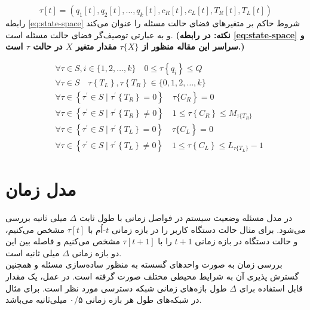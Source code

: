 \begin{equation}
	\label{eg:state}
	\tau[t]=\left(q_{1}[t], q_{2}[t], \ldots, q_{k}[t], c_{R}[t], c_{L}[t], T_{R}[t], T_{L}[t]\right)
\end{equation}
رابطه \ref{eq:state-space} شروط حاکم بر متغیرهای فضای حالت مسئله را عنوان می‌کند و به عبارتی توصیف‌گر فضای حالت مسئله است. \textbf{(نکته: در رابطه \ref{eq:state-space} و سراسر این مقاله منظور از \(\tau\{X\}\) مقدار متغیر \(X\) در حالت \(\tau\) است.)}

\begin{equation}
	\label{eq:state-space}
	\begin{aligned}
		&\forall \tau \in S, i \in \{1,2, \ldots, k\} \quad 0 \leqslant\tau\left\{q_{i}\right\} \leqslant Q\\
		&\forall \tau \in S \quad  \tau\left\{T_L\right\},  \tau\left\{T_R\right\} \in \{0, 1,2, \ldots, k\}\\
		&\left.\forall \tau \in\left\{\tau^{\prime} \in S \mid \tau^{\prime}\left\{T_{R}\right\}=0\right\} \quad \tau\{C_R\right\}=0\\
		&\forall \tau \in\left\{\tau^{\prime} \in S \mid \tau^{\prime}\left\{T_{R}\right\} \neq 0\right\} \quad 1 \leqslant \tau\left\{C_{R}\right\} \leqslant M_{\tau\{T_{R}\}} \\
		&\left.\forall \tau \in\left\{\tau^{\prime} \in S \mid \tau^{\prime}\left\{T_{L}\right\}=0\right\} \quad \tau\{C_L\right\}=0\\
		&\forall \tau \in\left\{\tau^{\prime} \in S \mid \tau^{\prime}\left\{T_{L}\right\} \neq 0\right\} \quad 1 \leqslant \tau\left\{C_{L}\right\} \leqslant L_{\tau\{T_{L}\}} - 1
	\end{aligned}
\end{equation}

\newpage
\section{مدل زمان}
در مدل مسئله وضعیت سیستم در فواصل زمانی با طول ثابت \(\Delta\) میلی ثانیه بررسی می‌شود. برای مثال حالت دستگاه کاربر را در بازه زمانی \(t\)-اُم با \(\tau[t]\) مشخص می‌کنیم، و حالت دستگاه در بازه زمانی \(t + 1\) را با \(\tau[t + 1]\) مشخص می‌کنیم و فاصله بین این دو بازه زمانی \(\Delta\) میلی ثانیه است. \\

بررسی زمان به صورت واحدهای گسسته به منظور ساده‌سازی مسئله و همچنین گسترش پذیری آن به شرایط محیطی مختلف صورت گرفته است. در عمل، یک مقدار قابل استفاده برای \(\Delta\) طول بازه‌های زمانی شبکه دسترسی مورد نظر است. برای مثال در شبکه‌های  طول هر بازه زمانی ۰/۵ میلی‌ثانیه می‌باشد. \cite{LTE}

